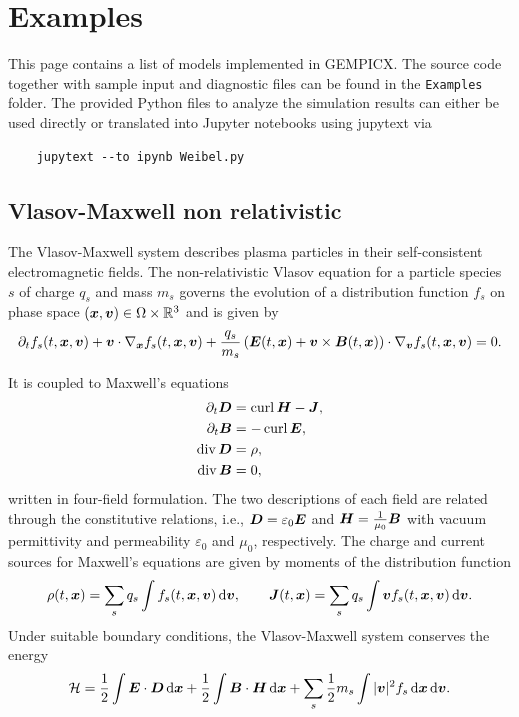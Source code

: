 \documentclass[11pt]{article}
\begin{document}
\section{Examples}

This page contains a list of models implemented in GEMPICX. The source code together with sample input and diagnostic files can be found in the \verb|Examples| folder.
The provided Python files to analyze the simulation results can either be used directly or translated into Jupyter notebooks using jupytext via
\begin{lstlisting}
    jupytext --to ipynb Weibel.py 
\end{lstlisting}

\subsection{Vlasov-Maxwell non relativistic}

The Vlasov-Maxwell system describes plasma particles in their self-consistent electromagnetic fields. The non-relativistic Vlasov equation for a particle species $s$ of charge $q_s$ and mass $m_s$ governs the evolution of a distribution function $f_s$ on phase space $({\boldsymbol x}, {\boldsymbol v}) \in \Omega \times \mathbb{R}^3$ and is given by
\begin{equation}
    \label{eq:vlasov}
    {\partial_{t}} f_s(t,{\boldsymbol x},{\boldsymbol v}) + {\boldsymbol v} \cdot \nabla_{\boldsymbol x} f_s(t,{\boldsymbol x},{\boldsymbol v}) + \frac{q_s}{m_s} \left(\boldsymbol E(t,{\boldsymbol x}) + {\boldsymbol v} \times \boldsymbol B(t,{\boldsymbol x})\right) \cdot \nabla_{\boldsymbol v} f_s(t,{\boldsymbol x},{\boldsymbol v}) = 0.
\end{equation}

It is coupled to Maxwell's equations
\begin{equation}
    \label{eq:maxwell_example}
    \begin{aligned}
        {\partial_{t}} \boldsymbol D  & = \operatorname{curl} \boldsymbol H - \boldsymbol J, \\
        {\partial_{t}} \boldsymbol B  & = - \operatorname{curl} \boldsymbol E,       \\
        \operatorname{div} \boldsymbol D & = \rho,                \\
        \operatorname{div} \boldsymbol B & = 0,
    \end{aligned}
\end{equation}
written in four-field formulation. The two descriptions of each field are related through the constitutive relations, i.e., $\boldsymbol D = \varepsilon_0 \boldsymbol E$ and $\boldsymbol H = \frac{1}{\mu_0} \boldsymbol B$ with vacuum permittivity and permeability $\varepsilon_0$ and $\mu_0$, respectively.
The charge and current sources for Maxwell's equations are given by moments of the distribution function
\begin{equation}
    \label{eq:vlasov_moments}
    \rho(t,{\boldsymbol x}) = \sum_s q_s \int f_s(t,{\boldsymbol x},{\boldsymbol v})\, {\rm d} {\boldsymbol v}, \qquad \boldsymbol J(t,{\boldsymbol x}) = \sum_s q_s \int {\boldsymbol v} f_s(t,{\boldsymbol x},{\boldsymbol v}) \, {\rm d} {\boldsymbol v}.
\end{equation}
Under suitable boundary conditions, the Vlasov-Maxwell system conserves the energy
\begin{equation}
    \mathcal{H} = \frac{1}{2} \int \boldsymbol E \cdot \boldsymbol D \, {\rm d}{\boldsymbol x} + \frac{1}{2} \int \boldsymbol B \cdot \boldsymbol H \, {\rm d}{\boldsymbol x} + \sum_s \frac{1}{2} m_s \int |{\boldsymbol v}|^2 f_s \, {\rm d}{\boldsymbol x} \, {\rm d}{\boldsymbol v}.
\end{equation}
\end{document}

